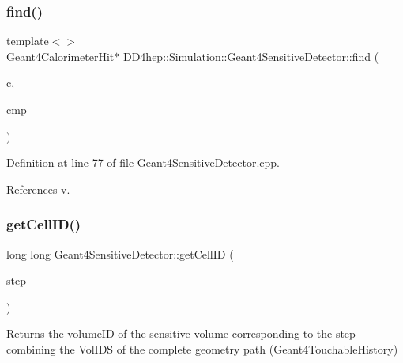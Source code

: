 \subsubsection{\texorpdfstring{find()}{find()}\hspace{0.1cm}{\footnotesize\ttfamily [2/2]}}
{\footnotesize\ttfamily template$<$$>$ \\
\hyperlink{class_d_d4hep_1_1_simulation_1_1_geant4_calorimeter_hit}{Geant4\+Calorimeter\+Hit}$\ast$ D\+D4hep\+::\+Simulation\+::\+Geant4\+Sensitive\+Detector\+::find (\begin{DoxyParamCaption}\item[{const \hyperlink{class_d_d4hep_1_1_simulation_1_1_geant4_sensitive_detector_a4865cf9c96edfef8cd41e309a4cd6211}{Hit\+Collection} $\ast$}]{c,  }\item[{const \hyperlink{class_d_d4hep_1_1_simulation_1_1_hit_compare}{Hit\+Compare}$<$ \hyperlink{class_d_d4hep_1_1_simulation_1_1_geant4_calorimeter_hit}{Geant4\+Calorimeter\+Hit} $>$ \&}]{cmp }\end{DoxyParamCaption})\hspace{0.3cm}{\ttfamily [protected]}}



Definition at line 77 of file Geant4\+Sensitive\+Detector.\+cpp.



References v.

\hypertarget{class_d_d4hep_1_1_simulation_1_1_geant4_sensitive_detector_a02a92ee533ee2067bc629f7a8b123c89}{}\label{class_d_d4hep_1_1_simulation_1_1_geant4_sensitive_detector_a02a92ee533ee2067bc629f7a8b123c89} 
\subsubsection{\texorpdfstring{get\+Cell\+I\+D()}{getCellID()}}
{\footnotesize\ttfamily long long Geant4\+Sensitive\+Detector\+::get\+Cell\+ID (\begin{DoxyParamCaption}\item[{G4\+Step $\ast$}]{step }\end{DoxyParamCaption})}

Returns the volume\+ID of the sensitive volume corresponding to the step -\/ combining the Vol\+I\+DS of the complete geometry path (Geant4\+Touchable\+History) 

